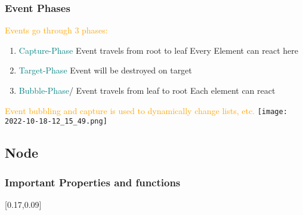 \documentclass[main.tex,fontsize=6pt,paper=a4,paper=landscape,DIV=calc,]{scrartcl}
\begin{document}
\begin{multicols*}{4}
\subsubsection{Event Phases} 
\textcolor{orange}{Events go through 3 phases:}\newline
\begin{enumerate}
  \item \textcolor{teal}{Capture-Phase}\newline
    Event travels from root to leaf\newline
    Every Element can react here
  \item \textcolor{teal}{Target-Phase}\newline
    Event will be destroyed on target
  \item \textcolor{teal}{Bubble-Phase}\newline/
    Event travels from leaf to root\newline
    Each element can react
\end{enumerate}
\vspace{2mm}
\textcolor{orange}{Event bubbling and capture is used to dynamically change lists, etc.}
\texttt{[image: 2022-10-18-12\_15\_49.png]}

\subsection{Node}

\subsubsection{Important Properties and functions} 
[0.17,0.09]


\end{multicols*}
\end{document}
